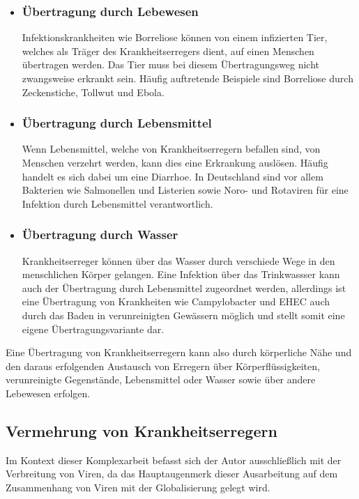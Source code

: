 \documentclass[12pt]{article}
\begin{document}
\begin{itemize}
    \item \subsubsection{Übertragung durch Lebewesen}
    Infektionskrankheiten wie Borreliose können von einem infizierten Tier, welches als Träger des Krankheitserregers dient, auf einen Menschen übertragen werden. Das Tier muss bei diesem Übertragungsweg nicht zwangsweise erkrankt sein. Häufig auftretende Beispiele sind Borreliose durch Zeckenstiche, Tollwut und Ebola.
    \item \subsubsection{Übertragung durch Lebensmittel}
    Wenn Lebensmittel, welche von Krankheitserregern befallen sind, von Menschen verzehrt werden, kann dies eine Erkrankung auslösen. Häufig handelt es sich dabei um eine Diarrhoe. In Deutschland sind vor allem Bakterien wie Salmonellen und Listerien sowie Noro- und Rotaviren für eine Infektion durch Lebensmittel verantwortlich.
    \item \subsubsection{Übertragung durch Wasser}
    Krankheitserreger können über das Wasser durch verschiede Wege in den menschlichen Körper gelangen. Eine Infektion über das Trinkwassser kann auch der Übertragung durch Lebensmittel zugeordnet werden, allerdings ist eine Übertragung von Krankheiten wie Campylobacter und EHEC auch durch das Baden in verunreinigten Gewässern möglich und stellt somit eine eigene Übertragungsvariante dar.
\end{itemize}
Eine Übertragung von Krankheitserregern kann also durch körperliche Nähe und den daraus erfolgenden Austausch von Erregern über Körperflüssigkeiten, verunreinigte Gegenstände, Lebensmittel oder Wasser sowie über andere Lebewesen erfolgen.
\subsection{Vermehrung von Krankheitserregern}
Im Kontext dieser Komplexarbeit befasst sich der Autor ausschließlich mit der Verbreitung von Viren, da das Hauptaugenmerk dieser Ausarbeitung auf dem Zusammenhang von Viren mit der Globalisierung gelegt wird.
\end{document}
